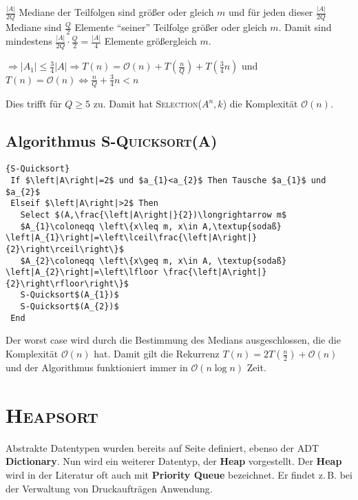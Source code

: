 \documentclass[ngerman,draft,parskip=half*,twoside]{scrreprt}
\theoremstyle{break}
\theoremstyle{nonumberbreak}
\newcommand*{\OO}{\mathcal{O}}      %
\begin{document}
 $\frac{\left|A\right|}{2Q}$ Mediane der Teilfolgen sind größer oder gleich $m$ und für jeden dieser $\frac{\left|A\right|}{2Q}$
 Mediane sind $\frac{Q}{2}$ Elemente "`seiner"' Teilfolge größer oder gleich $m$. Damit sind mindestens
 $\frac{\left|A\right|}{2Q}\cdot \frac{Q}{2}=\frac{\left|A\right|}{4}$ Elemente größergleich $m$.
	
 $\Rightarrow\left|A_{1}\right|\leq\frac{3}{4}\left|A\right|\Rightarrow T(n)=\OO(n)+T(\frac{n}{Q})+T(\frac{3}{4}n)$
und $T(n)=\OO(n)\Longleftrightarrow\frac{n}{Q}+\frac{3}{4}n<n$

 Dies trifft für $Q\geq 5$ zu. Damit hat \textsc{Selection}($A^n,k$) die Komplexität $\OO(n)$.

 \subsection{Algorithmus \textsc{S-Quicksort(A)}}

\begin{Algorithmus}[ht]
\begin{lstlisting}[frame=tlrb, mathescape=true, title=\textsc{S-Quicksort}, gobble=1]{S-Quicksort}
 If $\left|A\right|=2$ und $a_{1}<a_{2}$ Then Tausche $a_{1}$ und $a_{2}$
 Elseif $\left|A\right|>2$ Then
   Select $(A,\frac{\left|A\right|}{2})\longrightarrow m$
   $A_{1}\coloneqq \left\{x\leq m, x\in A,\textup{sodaß} \left|A_{1}\right|=\left\lceil\frac{\left|A\right|}{2}\right\rceil\right\}$
   $A_{2}\coloneqq \left\{x\geq m, x\in A, \textup{sodaß} \left|A_{2}\right|=\left\lfloor \frac{\left|A\right|}{2}\right\rfloor\right\}$
   S-Quicksort$(A_{1})$
   S-Quicksort$(A_{2})$
 End
 \end{lstlisting}
  \end{Algorithmus}

Der worst case wird durch die Bestimmung des Medians ausgeschlossen, die die Komplexität $\OO(n)$ hat. Damit gilt die Rekurrenz
$T(n)=2T(\frac{n}{2})+\OO(n)$ und der Algorithmus funktioniert immer in $\OO(n \log n)$ Zeit.
 
\section{\textsc{Heapsort}}
Abstrakte Datentypen wurden bereits auf Seite \pageref{ADT} definiert, ebenso der ADT \textbf{Dictionary}. Nun wird ein weiterer
Datentyp, der \textbf{Heap} vorgestellt. Der \textbf{Heap} wird in der Literatur oft auch mit \textbf{Priority Queue} bezeichnet.
Er findet z.\,B. bei der Verwaltung von Druckaufträgen Anwendung.
\end{document}

